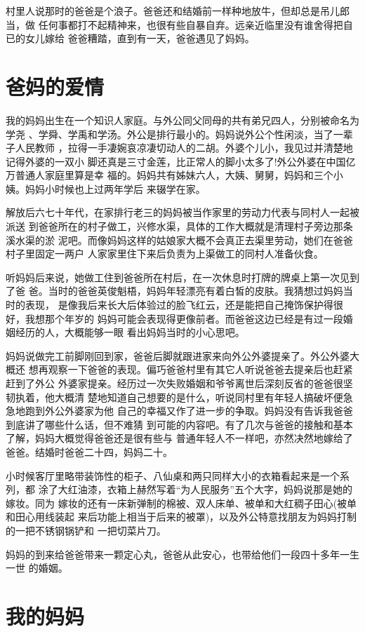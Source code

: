 \documentclass[12pt]{book}
\begin{document}
村里人说那时的爸爸是个浪子。爸爸还和结婚前一样种地放牛，但却总是吊儿郎当，做
任何事都打不起精神来，也很有些自暴自弃。远亲近临里没有谁舍得把自已的女儿嫁给
爸爸糟踏，直到有一天，爸爸遇见了妈妈。
\section{爸妈的爱情}
\label{sec-9-11}

我的妈妈出生在一个知识人家庭。与外公同父同母的共有弟兄四人，分别被命名为学尧
、学舜、学禹和学汤。外公是排行最小的。妈妈说外公个性闲淡，当了一辈子人民教师
，拉得一手凄婉哀凉凄切动人的二胡。外婆个儿小，我见过并清楚地记得外婆的一双小
脚还真是三寸金莲，比正常人的脚小太多了!外公外婆在中国亿万普通人家庭里算是幸
福的。妈妈共有姊妹六人，大姨、舅舅，妈妈和三个小姨。妈妈小时候也上过两年学后
来辍学在家。

解放后六七十年代，在家排行老三的妈妈被当作家里的劳动力代表与同村人一起被派送
到爸爸所在的村子做工，兴修水渠，具体的工作大概就是清理村子旁边那条溪水渠的淤
泥吧。而像妈妈这样的姑娘家大概不会真正去渠里劳动，她们在爸爸村子里固定一两户
人家家里住下来后负责为上渠做工的同村人准备伙食。

听妈妈后来说，她做工住到爸爸所在村后，在一次休息时打牌的牌桌上第一次见到了爸
爸。当时的爸爸英俊魁梧，妈妈年轻漂亮有着白皙的皮肤。我猜想过妈妈当时的表现，
是像我后来长大后体验过的脸飞红云，还是能把自己掩饰保护得很好，我想那个年岁的
妈妈可能会表现得更像前者。而爸爸这边已经是有过一段婚姻经历的人，大概能够一眼
看出妈妈当时的小心思吧。

妈妈说做完工前脚刚回到家，爸爸后脚就跟进家来向外公外婆提亲了。外公外婆大概还
想再观察一下爸爸的表现。偏巧爸爸村里有其它人听说爸爸去提亲后也赶紧赶到了外公
外婆家提亲。经历过一次失败婚姻和爷爷离世后深刻反省的爸爸很坚韧执着，他大概清
楚地知道自己想要的是什么，听说同村里有年轻人搞破坏便急急地跑到外公外婆家为他
自己的幸福又作了进一步的争取。妈妈没有告诉我爸爸到底讲了哪些什么话，但不难猜
到可能的内容吧。有了几次与爸爸的接触和基本了解，妈妈大概觉得爸爸还是很有些与
普通年轻人不一样吧，亦然决然地嫁给了爸爸。结婚时爸爸二十四，妈妈二十。

小时候客厅里略带装饰性的柜子、八仙桌和两只同样大小的衣箱看起来是一个系列，都
涂了大红油漆，衣箱上赫然写着“为人民服务”五个大字，妈妈说那是她的嫁妆。同为
嫁妆的还有一床新弹制的棉被、双人床单、被单和大红稠子田心(被单和田心用线装起
来后功能上相当于后来的被罩)，以及外公特意找朋友为妈妈打制的一把不锈钢锅铲和
一把切菜片刀。

妈妈的到来给爸爸带来一颗定心丸，爸爸从此安心，也带给他们一段四十多年一生一世
的婚姻。
\section{我的妈妈}
\label{sec-9-12}
\end{document}
